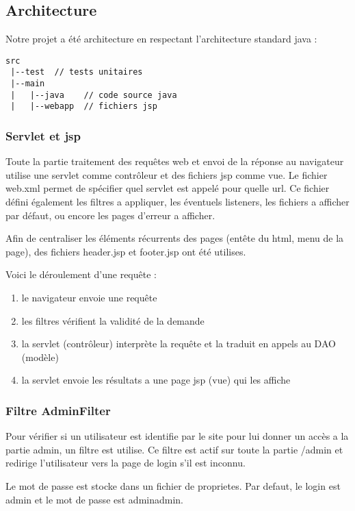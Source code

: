 \subsection{Architecture}

Notre projet a été architecture en respectant l'architecture standard java :
\begin{verbatim}
src
 |--test  // tests unitaires
 |--main
 |   |--java    // code source java
 |   |--webapp  // fichiers jsp
\end{verbatim}

\subsubsection{Servlet et jsp}
Toute la partie traitement des requêtes web et envoi de la réponse au navigateur utilise une servlet comme contrôleur et des fichiers jsp comme vue. Le fichier web.xml permet de spécifier quel servlet est appelé pour quelle url. Ce fichier défini également les filtres a appliquer, les éventuels listeners, les fichiers a afficher par défaut, ou encore les pages d'erreur a afficher.

Afin de centraliser les éléments récurrents des pages (entête du html, menu de la page), des fichiers header.jsp et footer.jsp ont été utilises.

Voici le déroulement d'une requête : 
\begin{enumerate}
	\item le navigateur envoie une requête
	\item les filtres vérifient la validité de la demande
	\item la servlet (contrôleur) interprète la requête et la traduit en appels au DAO (modèle)
	\item la servlet envoie les résultats a une page jsp (vue) qui les affiche
\end{enumerate}

\subsubsection{Filtre AdminFilter}
Pour vérifier si un utilisateur est identifie par le site pour lui donner un accès a la partie admin, un filtre est utilise. Ce filtre est actif sur toute la partie /admin et redirige l'utilisateur vers la page de login s'il est inconnu.

Le mot de passe est stocke dans un fichier de proprietes. Par defaut, le login est admin et le mot de passe est adminadmin.

